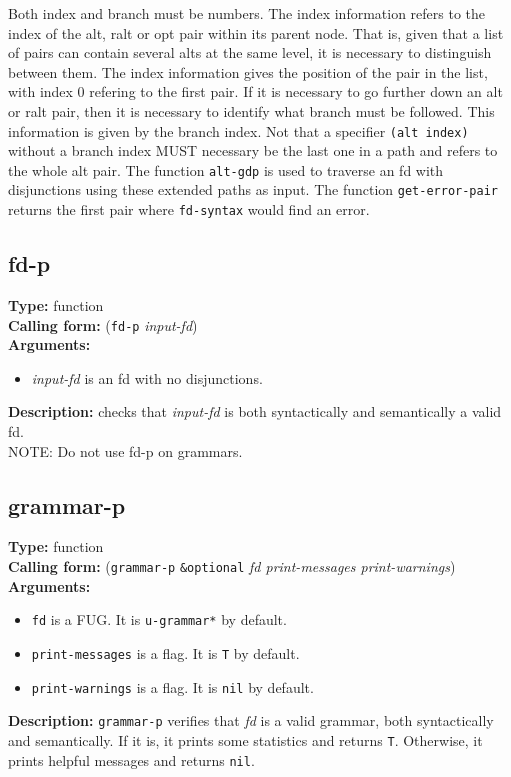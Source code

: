 \documentclass[10pt,a4paper]{report}
\begin{document}
Both index and branch must be numbers.
The index information refers to the index of the alt, ralt or opt pair
within its parent node.  That is, given that a list of pairs can contain
several alts at the same level, it is necessary to distinguish between
them.  The index information gives the position of the pair in the list,
with index 0 refering to the first pair.  If it is necessary to go further
down an alt or ralt pair, then it is necessary to identify what branch must
be followed.  This information is given by the branch index.  Not that a
specifier {\tt (alt index)} without a branch index MUST necessary be the
last one in a path and refers to the whole alt pair.  
The function {\tt alt-gdp} is used to traverse an fd with disjunctions using
these extended paths as input. 
The function {\tt get-error-pair} returns the first pair where {\tt fd-syntax}
would find an error. 



\subsection{fd-p}

{\bf Type:} function
\\{\bf Calling form:} ({\tt fd-p} {\em input-fd})
\\{\bf Arguments:}
\begin{itemize}
\item {\em input-fd} is an fd with no disjunctions.
\end{itemize}
{\bf Description:} checks that {\em input-fd} is both syntactically and
semantically a valid fd.
\\NOTE: Do not use fd-p on grammars.



\subsection{grammar-p}

{\bf Type:} function
\\{\bf Calling form:} ({\tt grammar-p} {\tt \&optional} {\em fd print-messages print-warnings})
\\{\bf Arguments:} \\\begin{itemize}
\item {\tt fd} is a FUG. It is {\tt *u-grammar*} by default.

\item {\tt print-messages} is a flag. It is {\tt T} by default.

\item {\tt print-warnings} is a flag. It is {\tt nil} by default.
\end{itemize}
{\bf Description:} {\tt grammar-p} verifies that {\em fd} is a valid
grammar, both syntactically and semantically. If it is, it prints
some statistics and returns {\tt T}.  Otherwise, it prints helpful
messages and returns {\tt nil}.
\end{document}

